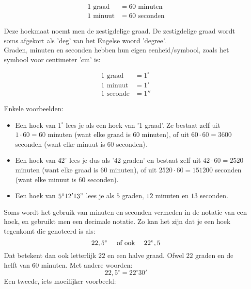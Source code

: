 \documentclass[a4paper,12pt]{article}
\begin{document}
\begin{framed}
\begin{align*}
	1 \textrm{ graad} &= 60 \textrm{ minuten}\\
	1 \textrm{ minuut} &= 60 \textrm{ seconden}
\end{align*}
\end{framed}

Deze hoekmaat noemt men de zestigdelige graad. De zestigdelige graad wordt soms afgekort als 'deg' van het Engelse woord 'degree'.\\
Graden, minuten en seconden hebben hun eigen eenheid/symbool, zoals het symbool voor centimeter 'cm' is:

\begin{framed}
\begin{align*}
	1 \textrm{ graad} &= 1^\circ\\
	1 \textrm{ minuut} &= 1'\\
	1 \textrm{ seconde} &= 1''
\end{align*}
\end{framed}

Enkele voorbeelden:

\begin{itemize}
	\item Een hoek van $1^\circ$ lees je als een hoek van '$1$ graad'. Ze bestaat zelf uit $1\cdot 60 = 60$ minuten (want elke graad is $60$ minuten), of uit $60 \cdot 60 = 3600$ seconden (want elke minuut is $60$ seconden).
	\item Een hoek van $42^\circ$ lees je dus als '$42$ graden' en bestaat zelf uit $42 \cdot 60 = 2520$ minuten (want elke graad is $60$ minuten), of uit $2520 \cdot 60 = 151200$ seconden (want elke minuut is $60$ seconden).
	\item Een hoek van $5^\circ12'13"$ lees je als $5$ graden, $12$ minuten en $13$ seconden.
\end{itemize}

Soms wordt het gebruik van minuten en seconden vermeden in de notatie van een hoek, en gebruikt men een decimale notatie. Zo kan het zijn dat je een hoek tegenkomt die genoteerd is als:
\[22,5^\circ \quad \textup{ of ook } \quad 22^\circ,5\]
Dat betekent dan ook letterlijk $22$ en een halve graad. Ofwel $22$ graden en de helft van $60$ minuten. Met andere woorden:
\[22,5^\circ = 22^\circ30'\]
Een tweede, iets moeilijker voorbeeld:
\end{document}
